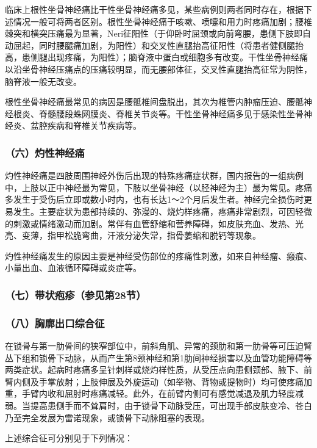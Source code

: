 临床上根性坐骨神经痛比干性坐骨神经痛多见，某些病例则两者同时存在，根据下述情况一般可将两者区别。根性坐骨神经痛于咳嗽、喷嚏和用力时疼痛加剧；腰椎棘突和横突压痛最为显著，Neri征阳性（于仰卧时屈颈或向前弯腰，患侧下肢即自动屈起，同时腰腿痛加剧，为阳性）和交叉性直腿抬高征阳性（将患者健侧腿抬高，患侧腿出现疼痛，为阳性）；脑脊液中蛋白或细胞多有改变。干性坐骨神经痛以沿坐骨神经压痛点的压痛较明显，而无腰部体征，交叉性直腿抬高征常为阴性，脑脊液一般无改变。

根性坐骨神经痛最常见的病因是腰骶椎间盘脱出，其次为椎管内肿瘤压迫、腰骶神经根炎、脊髓腰段蛛网膜炎、脊椎关节炎等。干性坐骨神经痛多见于感染性坐骨神经炎、盆腔疾病和脊椎关节疾病等。

\subsubsection{（六）灼性神经痛}

灼性神经痛是四肢周围神经外伤后出现的特殊疼痛症状群，国内报告的一组病例中，上肢以正中神经最为常见，下肢以坐骨神经（以胫神经为主）最为常见。疼痛多发生于受伤后立即或数小时内，也有长达1～2个月后发生者。神经完全损伤时更易发生。主要症状为患部持续的、弥漫的、烧灼样疼痛，疼痛非常剧烈，可因轻微的刺激或情绪激动而加剧。常伴有血管舒缩和营养障碍，如皮肤充血、发热、光亮、变薄，指甲松脆弯曲，汗液分泌失常，指骨萎缩和脱钙等现象。

灼性神经痛发生的原因主要是神经受伤部位的疼痛性刺激，如来自神经瘤、瘢痕、小量出血、血液循环障碍或炎症等。

\subsubsection{（七）带状疱疹（参见第28节）}

\subsubsection{（八）胸廓出口综合征}

在锁骨与第一肋骨间的狭窄部位中，前斜角肌、异常的颈肋和第一肋骨等可压迫臂丛下组和锁骨下动脉，从而产生第8颈神经和第1肋间神经损害以及血管功能障碍等两类症状。起病时疼痛多呈针刺样或烧灼样性质，从受压点向患侧颈部、腋下、前臂内侧及手掌放射；上肢伸展及外旋运动（如举物、背物或提物时）均可使疼痛加重，手臂内收和屈肘时疼痛减轻。此外，在前臂内侧可有感觉减退及肌力轻度减弱。当提高患侧手而不耸肩时，由于锁骨下动脉受压，可出现手部皮肤变冷、苍白乃至完全发展为雷诺现象，或锁骨下动脉阻塞的表现。

上述综合征可分别见于下列情况：

